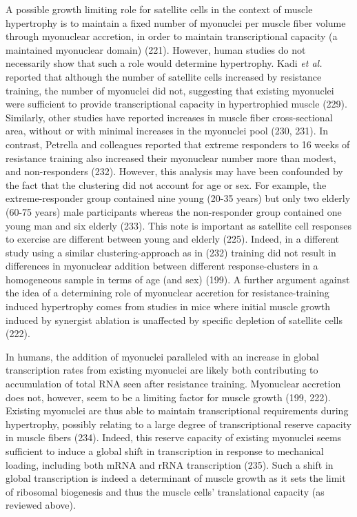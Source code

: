 \documentclass[twoside,10pt]{gihclass} %
\begin{document}
A possible growth limiting role for satellite cells in the context of muscle hypertrophy is to maintain a fixed number of myonuclei per muscle fiber volume through myonuclear accretion, in order to maintain transcriptional capacity (a maintained myonuclear domain)
(221).
However, human studies do not necessarily show that such a role would determine hypertrophy.
Kadi \emph{et al.} reported that although the number of satellite cells increased by resistance training, the number of myonuclei did not,
suggesting that existing myonuclei were sufficient to provide transcriptional capacity in hypertrophied muscle
(229).
Similarly, other studies have reported increases in muscle fiber cross-sectional area, without or with minimal increases in the myonuclei pool
(230, 231).
In contrast, Petrella and colleagues reported that extreme responders to 16 weeks of resistance training also increased their myonuclear number more than modest, and non-responders
(232).
However, this analysis may have been confounded by the fact that the clustering did not account for age or sex. For example, the extreme-responder group contained nine young (20-35 years) but only two elderly (60-75 years) male participants whereas the non-responder group contained one young man and six elderly
(233).
This note is important as satellite cell responses to exercise are different between young and elderly
(225).
Indeed, in a different study using a similar clustering-approach as in (232) training did not result in differences in myonuclear addition between different response-clusters in a homogeneous sample in terms of age (and sex)
(199).
A further argument against the idea of a determining role of myonuclear accretion for resistance-training induced hypertrophy comes from studies in mice where initial muscle growth induced by synergist ablation is unaffected by specific depletion of satellite cells
(222).

In humans, the addition of myonuclei paralleled with an increase in global transcription rates from existing myonuclei are likely both contributing to accumulation of total RNA seen after resistance training.
Myonuclear accretion does not, however, seem to be a limiting factor for muscle growth
(199, 222).
Existing myonuclei are thus able to maintain transcriptional requirements during hypertrophy, possibly relating to a large degree of transcriptional reserve capacity in muscle fibers
(234).
Indeed, this reserve capacity of existing myonuclei seems sufficient to induce a global shift in transcription in response to mechanical loading, including both mRNA and rRNA transcription
(235).
Such a shift in global transcription is indeed a determinant of muscle growth as it sets the limit of ribosomal biogenesis and thus the muscle cells' translational capacity (as reviewed above).
\end{document}
